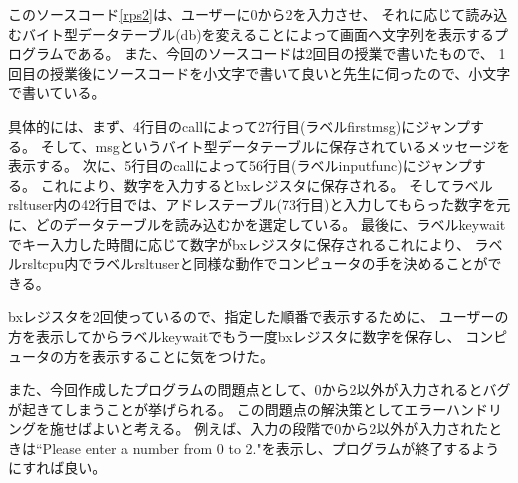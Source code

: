 \documentclass[12pt]{jarticle}
\begin{document}
このソースコード\ref{rps2}は、ユーザーに0から2を入力させ、
それに応じて読み込むバイト型データテーブル(db)を変えることによって画面へ文字列を表示するプログラムである。
また、今回のソースコードは2回目の授業で書いたもので、
1回目の授業後にソースコードを小文字で書いて良いと先生に伺ったので、小文字で書いている。

具体的には、まず、4行目のcallによって27行目(ラベルfirstmsg)にジャンプする。
そして、msgというバイト型データテーブルに保存されているメッセージを表示する。
次に、5行目のcallによって56行目(ラベルinputfunc)にジャンプする。
これにより、数字を入力するとbxレジスタに保存される。
そしてラベルrsltuser内の42行目では、アドレステーブル(73行目)と入力してもらった数字を元に、どのデータテーブルを読み込むかを選定している。
最後に、ラベルkeywaitでキー入力した時間に応じて数字がbxレジスタに保存されるこれにより、
ラベルrsltcpu内でラベルrsltuserと同様な動作でコンピュータの手を決めることができる。

bxレジスタを2回使っているので、指定した順番で表示するために、
ユーザーの方を表示してからラベルkeywaitでもう一度bxレジスタに数字を保存し、
コンピュータの方を表示することに気をつけた。

また、今回作成したプログラムの問題点として、0から2以外が入力されるとバグが起きてしまうことが挙げられる。
この問題点の解決策としてエラーハンドリングを施せばよいと考える。
例えば、入力の段階で0から2以外が入力されたときは``Please enter a number from 0 to 2."を表示し、プログラムが終了するようにすれば良い。
\end{document}
